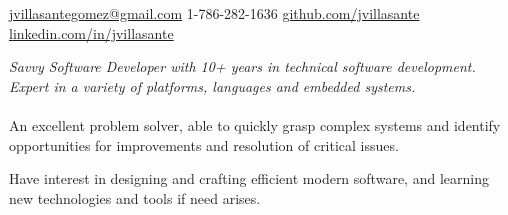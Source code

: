 \documentclass[10pt,a4paper]{article}
\begin{document}
\sloppy  %



\nobreakvspace{0.3em}  %

\noindent\href{mailto:jvillasantegomez.at.gmail.dot.com}{jvillasantegomez\mbox{}@\mbox{}gmail.com}\sbull
\textsmaller{+}1-786-282-1636\sbull
\href{https://github.com/jvillasante}{github.com/jvillasante}\sbull
\href{http://linkedin.com/in/jvillasante}{linkedin.com/in/jvillasante}
\\

\spacedhrule{0.9em}{-0.4em}  %


\vspace{-1.3em}  %
\begin{multicols}{2}  %
    \noindent \emph{Savvy Software Developer with 10+ years in technical software development. Expert in a variety of platforms, languages and embedded systems.}
    \\
    \\
    An excellent problem solver, able to quickly grasp complex systems and identify opportunities for improvements and resolution of critical issues.

    Have interest in designing and crafting efficient modern software, and learning new technologies and tools if need arises.
\end{multicols}

\spacedhrule{0em}{-0.4em}

\end{document}
